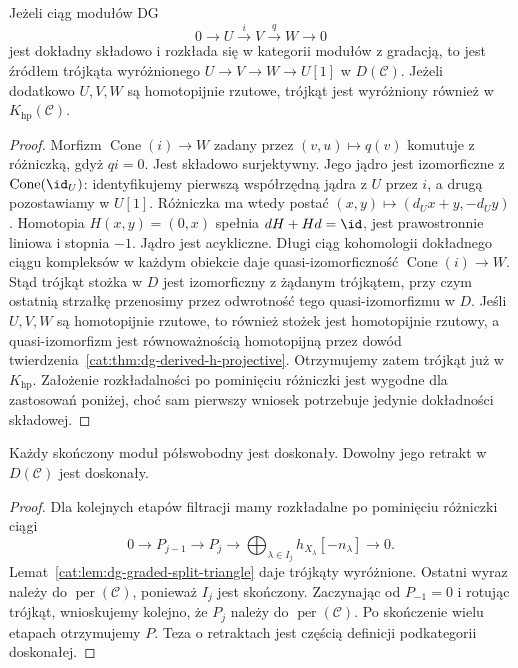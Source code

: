 \begin{lemat}\label{cat:lem:dg-graded-split-triangle}
Jeżeli ciąg modułów DG
\[
 0\longrightarrow U\xrightarrow{i}V\xrightarrow{q}W\longrightarrow0
\]
jest dokładny składowo i rozkłada się w kategorii modułów z gradacją, to jest źródłem trójkąta wyróżnionego $U\to V\to W\to U[1]$ w $D(\mathcal C)$. Jeżeli dodatkowo $U,V,W$ są homotopijnie rzutowe, trójkąt jest wyróżniony również w $K_{\mathrm{hp}}(\mathcal C)$.
\end{lemat}
\begin{proof}
Morfizm $\operatorname{Cone}(i)\to W$ zadany przez $(v,u)\mapsto q(v)$ komutuje z różniczką, gdyż $qi=0$. Jest składowo surjektywny. Jego jądro jest izomorficzne z $\operatorname{Cone}(\id_U)$: identyfikujemy pierwszą współrzędną jądra z $U$ przez $i$, a drugą pozostawiamy w $U[1]$. Różniczka ma wtedy postać $(x,y)\mapsto(d_Ux+y,-d_Uy)$. Homotopia $H(x,y)=(0,x)$ spełnia $dH+Hd=\id$, jest prawostronnie liniowa i stopnia $-1$. Jądro jest acykliczne. Długi ciąg kohomologii dokładnego ciągu kompleksów w każdym obiekcie daje quasi-izomorficzność $\operatorname{Cone}(i)\to W$. Stąd trójkąt stożka w $D$ jest izomorficzny z żądanym trójkątem, przy czym ostatnią strzałkę przenosimy przez odwrotność tego quasi-izomorfizmu w $D$. Jeśli $U,V,W$ są homotopijnie rzutowe, to również stożek jest homotopijnie rzutowy, a quasi-izomorfizm jest równoważnością homotopijną przez dowód twierdzenia~\ref{cat:thm:dg-derived-h-projective}. Otrzymujemy zatem trójkąt już w $K_{\mathrm{hp}}$. Założenie rozkładalności po pominięciu różniczki jest wygodne dla zastosowań poniżej, choć sam pierwszy wniosek potrzebuje jedynie dokładności składowej.
\end{proof}

\begin{stwierdzenie}\label{cat:prop:dg-finite-semifree-perfect}
Każdy skończony moduł półswobodny jest doskonały. Dowolny jego retrakt w $D(\mathcal C)$ jest doskonały.
\end{stwierdzenie}
\begin{proof}
Dla kolejnych etapów filtracji mamy rozkładalne po pominięciu różniczki ciągi
\[
 0\to P_{j-1}\to P_j\to
       \bigoplus_{\lambda\in I_j}h_{X_\lambda}[-n_\lambda]\to0.
\]
Lemat~\ref{cat:lem:dg-graded-split-triangle} daje trójkąty wyróżnione. Ostatni wyraz należy do $\operatorname{per}(\mathcal C)$, ponieważ $I_j$ jest skończony. Zaczynając od $P_{-1}=0$ i rotując trójkąt, wnioskujemy kolejno, że $P_j$ należy do $\operatorname{per}(\mathcal C)$. Po skończenie wielu etapach otrzymujemy $P$. Teza o retraktach jest częścią definicji podkategorii doskonałej.
\end{proof}

